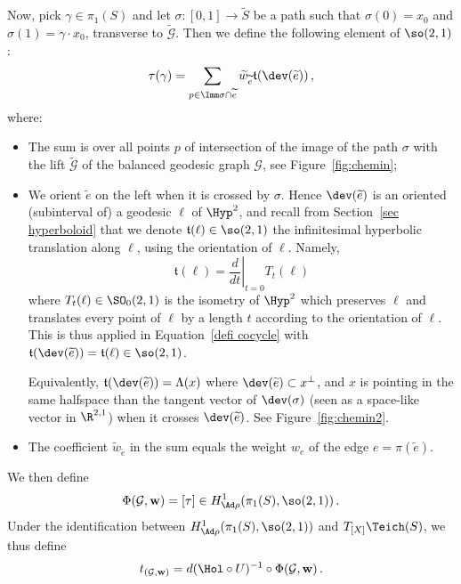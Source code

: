 Now, pick $\gamma\in\pi_1(S)$ and let $\sigma:[0,1]\to\widetilde S$ be a path such that $\sigma(0)=x_0$ and $\sigma(1)=\gamma\cdot x_0$, transverse to $\widetilde{\mathcal{G}}$. Then we define the following element of $\so(2,1)$:
\begin{equation}\label{defi cocycle}
\tau(\gamma)=\sum_{p\in \Imm\sigma\cap \widetilde e} \widetilde w_{\widetilde e} \mathfrak t(\dev(\widetilde e))\,,
\end{equation}
where:
\begin{itemize}
\item The sum is over all points $p$ of intersection of the image of the path $\sigma$ with the lift $\widetilde{\mathcal{G}}$ of the balanced geodesic graph $\mathcal{G}$, see Figure~\ref{fig:chemin};
\item We orient $\tilde{e}$ on the left when it is crossed by $\sigma$. Hence $\dev(\widetilde e)$ is an oriented (subinterval of) a geodesic $\ell$ of $\Hyp^2$, and recall from Section~\ref{sec hyperboloid} that we denote $\mathfrak t(\ell)\in\so(2,1)$ the infinitesimal hyperbolic translation along $\ell$, using the orientation of $\ell$. Namely,
\[
\mathfrak t(\ell)=\left.\frac{d}{dt}\right|_{t=0}T_t(\ell)
\]
where $T_t(\ell)\in\SO_0(2,1)$ is the isometry of $\Hyp^2$ which preserves $\ell$ and translates every point of $\ell$ by a length $t$ according to the orientation of $\ell$. This is thus applied in Equation~\eqref{defi cocycle} with $\mathfrak t(\dev(\widetilde e))=\mathfrak t(\ell)\in \so(2,1)$.

Equivalently, $\mathfrak t(
\dev(\widetilde e))=\Lambda(x)$ where $\dev(\widetilde e)\subset x^\perp$, and $x$ is pointing in the same halfspace than the tangent vector of $\dev(\sigma)$ (seen as a space-like vector in $\R^{2,1}$) when it crosses $\dev(\widetilde e)$. See Figure~\ref{fig:chemin2}.
\item The coefficient $\widetilde w_{\widetilde e}$ in the sum equals the weight $w_e$ of the edge $e=\pi(\widetilde e)$.
\end{itemize}
We then define
\[
\Phi(\mathcal{G},\mathbf w)=[\tau]\in H^1_{\Ad\rho}(\pi_1(S),\so(2,1))\,.
\]
Under the identification between $H^1_{\Ad\rho}(\pi_1(S),\so(2,1))$ and $T_{[X]}\Teich(S)$, we thus define
\begin{equation}\label{eq defi variation teich}
t_{(\mathcal{G},\mathbf w)}=d(\Hol\circ U)^{-1}\circ \Phi(\mathcal{G},\mathbf w)\,.
\end{equation}



